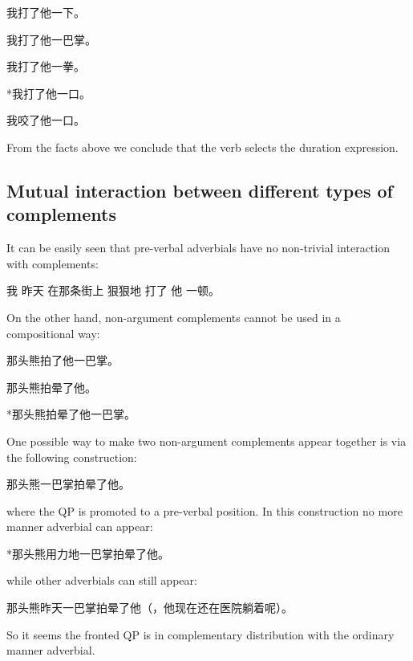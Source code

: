 \documentclass[../main.tex]{subfiles}
\begin{document}
我打了他一下。

我打了他一巴掌。

我打了他一拳。

*我打了他一口。

我咬了他一口。

From the facts above we conclude that the verb selects the duration expression. 

\subsection{Mutual interaction between different types of complements}

It can be easily seen that pre-verbal adverbials have no non-trivial interaction with complements:

我 昨天 在那条街上 狠狠地 打了 他 一顿。

On the other hand, non-argument complements cannot be used in a compositional way:

那头熊拍了他一巴掌。

那头熊拍晕了他。

*那头熊拍晕了他一巴掌。


One possible way to make two non-argument complements appear together is via the following construction:

那头熊一巴掌拍晕了他。

where the QP is promoted to a pre-verbal position. In this construction no more manner adverbial can appear:

*那头熊用力地一巴掌拍晕了他。

while other adverbials can still appear:

那头熊昨天一巴掌拍晕了他（，他现在还在医院躺着呢）。

So it seems the fronted QP is in complementary distribution with the ordinary manner adverbial.
\end{document}
